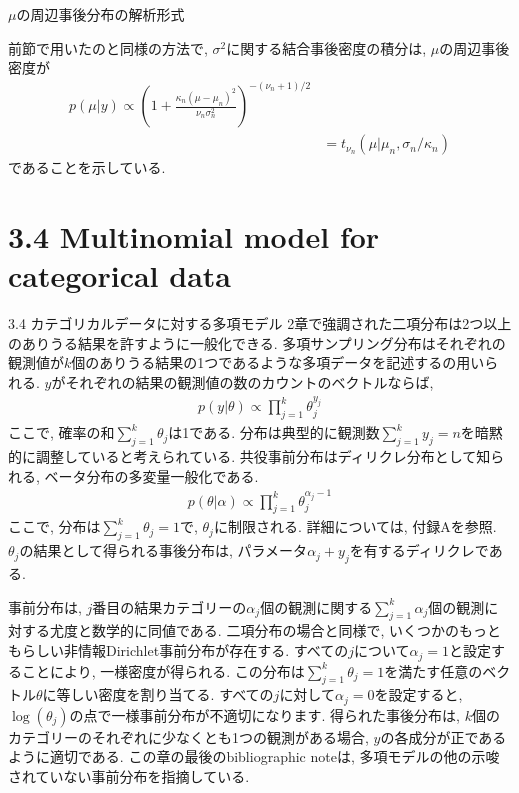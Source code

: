 \documentclass[10pt,dvipdfmx,a4]{beamer}
\newcommand{\eqn}[1]{\begin{align*}#1\end{align*}}
\begin{document}

\begin{frame}{$\mu$の周辺事後分布の解析形式}

前節で用いたのと同様の方法で, $\sigma^2$に関する結合事後密度の積分は, $\mu$の周辺事後密度が
\eqn{p(\mu|y)\propto \left(1+\frac{\kappa_n(\mu-\mu_n)^2}{\nu_n\sigma^2_n}\right)^{-(\nu_n+1)/2}\\
&=t_{\nu_n}(\mu|\mu_n,\sigma_n/\kappa_n)}
であることを示している.
\end{frame}

\section{3.4 Multinomial model for categorical data}
\begin{frame}{3.4 カテゴリカルデータに対する多項モデル}
2章で強調された二項分布は2つ以上のありうる結果を許すように一般化できる.
多項サンプリング分布はそれぞれの観測値が$k$個のありうる結果の1つであるような多項データを記述するの用いられる.
$y$がそれぞれの結果の観測値の数のカウントのベクトルならば,
\eqn{p(y|\theta)\propto\prod_{j=1}^k \theta_j^{y_j}}
ここで, 確率の和$\sum_{j=1}^k\theta_j$は1である.
分布は典型的に観測数$\sum_{j=1}^k y_j=n$を暗黙的に調整していると考えられている.
共役事前分布はディリクレ分布として知られる, ベータ分布の多変量一般化である.
\eqn{p(\theta|\alpha)\propto \prod_{j=1}^k\theta_j^{\alpha_j-1}}
ここで, 分布は$\sum_{j=1}^k \theta_j=1$で, $\theta_j$に制限される.
詳細については, 付録Aを参照.
$\theta_j$の結果として得られる事後分布は, パラメータ$\alpha_j+y_j$を有するディリクレである.
\end{frame}


\begin{frame}
事前分布は, $j$番目の結果カテゴリーの$\alpha_j$個の観測に関する$\sum_{j=1}^k \alpha_j$個の観測に対する尤度と数学的に同値である.
二項分布の場合と同様で, いくつかのもっともらしい非情報Dirichlet事前分布が存在する.
すべての$j$について$\alpha_j= 1$と設定することにより, 一様密度が得られる.
この分布は$\sum^k_{j=1}\theta_j=1$を満たす任意のベクトル$\theta$に等しい密度を割り当てる.
すべての$j$に対して$\alpha_j= 0$を設定すると, $\log(\theta_j)$の点で一様事前分布が不適切になります.
得られた事後分布は, $k$個のカテゴリーのそれぞれに少なくとも1つの観測がある場合, $y$の各成分が正であるように適切である.
この章の最後のbibliographic noteは, 多項モデルの他の示唆されていない事前分布を指摘している.
\end{frame}
\end{document}

